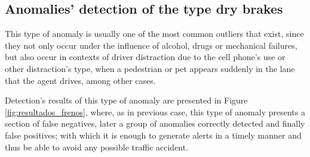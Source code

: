 \subsection{Anomalies' detection of the type dry brakes}

This type of anomaly is usually one of the most common outliers that exist, since they not only occur under the influence of alcohol, drugs or mechanical failures, but also occur in contexts of driver distraction due to the cell phone's use or other distraction's type, when a pedestrian or pet appears suddenly in the lane that the agent drives, among other cases.

\vspace{5mm} %

Detection's results of this type of anomaly are presented in Figure \ref{fig:resultados_frenos}, where, as in previous case, this type of anomaly presents a section of false negatives, later a group of anomalies correctly detected and finally false positives; with which it is enough to generate alerts in a timely manner and thus be able to avoid any possible traffic accident.

